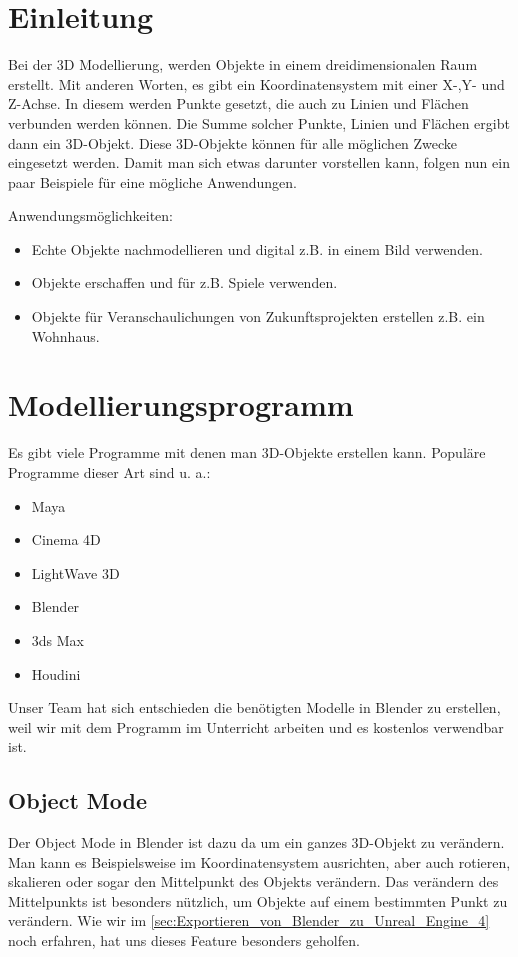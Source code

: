 \section{Einleitung}
Bei der 3D Modellierung, werden Objekte in einem dreidimensionalen Raum erstellt. Mit anderen Worten, es gibt ein Koordinatensystem mit einer X-,Y- und Z-Achse.
In diesem werden Punkte gesetzt, die auch zu Linien und Flächen verbunden werden können. Die Summe solcher Punkte, Linien und Flächen ergibt dann ein 3D-Objekt.
Diese 3D-Objekte können für alle möglichen Zwecke eingesetzt werden. Damit man sich etwas darunter vorstellen kann, folgen nun ein paar Beispiele für
eine mögliche Anwendungen.

Anwendungsmöglichkeiten:
\begin{itemize}
    \item Echte Objekte nachmodellieren und digital z.B. in einem Bild verwenden.
    \item Objekte erschaffen und für z.B. Spiele verwenden.
    \item Objekte für Veranschaulichungen von Zukunftsprojekten erstellen z.B. ein Wohnhaus.
\end{itemize}

\section{Modellierungsprogramm}
Es gibt viele Programme mit denen man 3D-Objekte erstellen kann.
\citep{wiki:modellierungsprogramm_beispiele}  Populäre Programme dieser Art sind u. a.:

\begin{itemize}
    \item Maya
    \item Cinema 4D
    \item LightWave 3D
    \item Blender
    \item 3ds Max
    \item Houdini
\end{itemize}

Unser Team hat sich entschieden die benötigten Modelle in Blender zu erstellen, weil wir mit dem Programm im Unterricht arbeiten und
es kostenlos verwendbar ist.


\subsection{Object Mode}
Der Object Mode in Blender ist dazu da um ein ganzes 3D-Objekt zu verändern. Man kann es Beispielsweise im Koordinatensystem ausrichten, aber
auch rotieren, skalieren oder sogar den Mittelpunkt des Objekts verändern. Das verändern des Mittelpunkts ist besonders nützlich, um Objekte auf
einem bestimmten Punkt zu verändern. Wie wir im \autoref{sec:Exportieren_von_Blender_zu_Unreal_Engine_4} noch erfahren, hat uns dieses Feature besonders geholfen.


